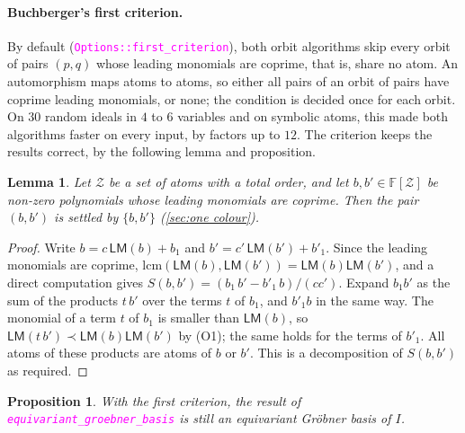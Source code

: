 \documentclass[12pt,a4paper,article]{memoir}
\newcommand{\F}{\mathbb{F}}
\newcommand{\poly}[2]{#1[#2]}
\newcommand{\code}[1]{\texttt{\textcolor{magenta}{#1}}}
\newcommand{\LM}{\mathsf{LM}}
\newtheorem{lemma}[theorem]{Lemma}
\newtheorem{proposition}[theorem]{Proposition}
\theoremstyle{definition}
\begin{document}
\paragraph{Buchberger's first criterion.}
By default (\code{Options::first\_criterion}), both orbit algorithms skip every orbit of pairs $(p, q)$
whose leading monomials are coprime, that is, share no atom.
An automorphism maps atoms to atoms, so either all pairs of an orbit of pairs have coprime leading monomials, or none;
the condition is decided once for each orbit.
On $30$ random ideals in $4$ to $6$ variables and on symbolic atoms,
this made both algorithms faster on every input, by factors up to $12$.
The criterion keeps the results correct, by the following lemma and proposition.

\begin{lemma}\label{lem:first criterion}
Let $\mathcal{Z}$ be a set of atoms with a total order,
and let $b, b' \in \poly{\F}{\mathcal{Z}}$ be non-zero polynomials whose leading monomials are coprime.
Then the pair $(b, b')$ is settled by $\{b, b'\}$ (\cref{sec:one colour}).
\end{lemma}

\begin{proof}
Write $b = c\,\LM(b) + b_1$ and $b' = c'\,\LM(b') + b'_1$.
Since the leading monomials are coprime, $\mathrm{lcm}(\LM(b), \LM(b')) = \LM(b)\LM(b')$,
and a direct computation gives $S(b, b') = (b_1\, b' - b'_1\, b)/(c c')$.
Expand $b_1 b'$ as the sum of the products $t\, b'$ over the terms $t$ of $b_1$, and $b'_1 b$ in the same way.
The monomial of a term $t$ of $b_1$ is smaller than $\LM(b)$, so $\LM(t\, b') \prec \LM(b)\LM(b')$ by (O1);
the same holds for the terms of $b'_1$.
All atoms of these products are atoms of $b$ or $b'$.
This is a decomposition of $S(b, b')$ as required.
\end{proof}

\begin{proposition}
With the first criterion, the result of \code{equivariant\_groebner\_basis} is still an equivariant Gr\"{o}bner basis of $I$.
\end{proposition}
\end{document}
